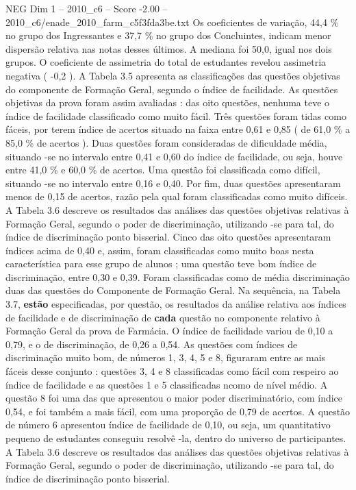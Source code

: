 \begin{textsample}{NEG Dim 1 – 2010\_c6 – Score -2.00 – 2010\_c6/enade\_2010\_farm\_c5f3fda3be.txt}
Os coeficientes de variação, 44,4 \% no grupo dos Ingressantes e 37,7 \% no grupo dos Concluintes, indicam menor dispersão relativa nas notas desses últimos.
A mediana foi 50,0, igual nos dois grupos.
O coeficiente de assimetria do total de estudantes revelou assimetria negativa ( -0,2 ).
A Tabela 3.5 apresenta as classificações das questões objetivas do componente de Formação Geral, segundo o índice de facilidade.
As questões objetivas da prova foram assim avaliadas : das oito questões, nenhuma teve o índice de facilidade classificado como muito fácil.
Três questões foram tidas como fáceis, por terem índice de acertos situado na faixa entre 0,61 e 0,85 ( de 61,0 \% a 85,0 \% de acertos ).
Duas questões foram consideradas de dificuldade média, situando -se no intervalo entre 0,41 e 0,60 do índice de facilidade, ou seja, houve entre 41,0 \% e 60,0 \% de acertos.
Uma questão foi classificada como difícil, situando -se no intervalo entre 0,16 e 0,40.
Por fim, duas questões apresentaram menos de 0,15 de acertos, razão pela qual foram classificadas como muito difíceis.
A Tabela 3.6 descreve os resultados das análises das questões objetivas relativas à Formação Geral, segundo o poder de discriminação, utilizando -se para tal, do índice de discriminação ponto bisserial.
Cinco das oito questões apresentaram índices acima de 0,40 e, assim, foram classificadas como muito boas nesta característica para esse grupo de alunos ; uma questão teve bom índice de discriminação, entre 0,30 e 0,39.
Foram classificadas como de média discriminação duas das questões do Componente de Formação Geral.
Na sequência, na Tabela 3.7, \textbf{estão} especificadas, por questão, os resultados da análise relativa aos índices de facilidade e de discriminação de \textbf{cada} questão no componente relativo à Formação Geral da prova de Farmácia.
O índice de facilidade variou de 0,10 a 0,79, e o de discriminação, de 0,26 a 0,54.
As questões com índices de discriminação muito bom, de números 1, 3, 4, 5 e 8, figuraram entre as mais fáceis desse conjunto : questões 3, 4 e 8 classificadas como fácil com respeiro ao índice de facilidade e as questões 1 e 5 classificadas ncomo de nível médio.
A questão 8 foi uma das que apresentou o maior poder discriminatório, com índice 0,54, e foi também a mais fácil, com uma proporção de 0,79 de acertos.
A questão de número 6 apresentou índice de facilidade de 0,10, ou seja, um quantitativo pequeno de estudantes conseguiu resolvê -la, dentro do universo de participantes.
A Tabela 3.6 descreve os resultados das análises das questões objetivas relativas à Formação Geral, segundo o poder de discriminação, utilizando -se para tal, do índice de discriminação ponto bisserial.

\end{textsample}
